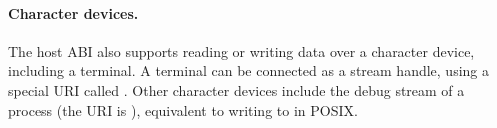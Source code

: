 \paragraph{Character devices.}
The host ABI also supports reading or writing data over a character device, including a terminal.
A terminal can be connected as a stream handle,
using a special URI called .
Other character devices include the debug stream of a process (the URI is ),
equivalent to writing to  in POSIX.





